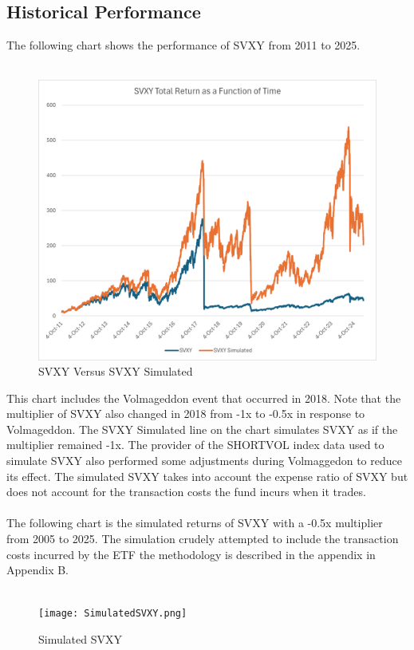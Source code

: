 \documentclass[11pt, oneside]{book}
\begin{document}
\subsection{Historical Performance} \label{Investing-PurchETF-Historical}
The following chart shows the performance of SVXY from 2011 to 2025.\\
\\
\begin{figure}[H]
\centering
\includegraphics[width=\textwidth]{SVXY.png}
\caption{SVXY Versus SVXY Simulated} \label{Fig-SVXYVersusSIMSVXY}
\end{figure}
\noindent
This chart includes the Volmageddon event that occurred in 2018. Note that the multiplier of SVXY also changed in 2018 from -1x to -0.5x in response to Volmageddon. The SVXY Simulated line on the chart simulates SVXY as if the multiplier remained -1x. The provider of the SHORTVOL index data used to simulate SVXY also performed some adjustments during Volmaggedon to reduce its effect. The simulated SVXY takes into account the expense ratio of SVXY but does not account for the transaction costs the fund incurs when it trades.\\
\\
The following chart is the simulated returns of SVXY with a -0.5x multiplier from 2005 to 2025. The simulation crudely attempted to include the transaction costs incurred by the ETF the methodology is described in the appendix in Appendix B.\\
\\
\begin{figure}[H]
\centering
\texttt{[image: SimulatedSVXY.png]}
\caption{Simulated SVXY} \label{Fig-SimSVXY}
\end{figure}
\end{document}
